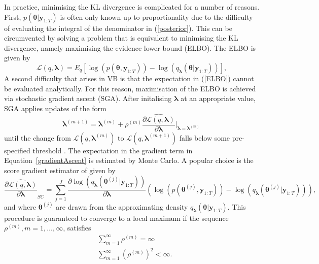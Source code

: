 \documentclass[12pt,a4paper]{article}\usepackage[]{graphicx}\usepackage[]{color}
\begin{document}
{In practice, minimising the KL divergence is complicated for a number of reasons.  First, $p({\bm\theta} | {\bm y}_{1:T})$ is often only known up to proportionality due to the difficulty of evaluating the integral of the denominator in (\ref{posterior}).  This can be circumvented by solving a problem that is equivalent to minimising the KL divergence, namely maximising the evidence lower bound (ELBO).  The ELBO is given by
\begin{equation}
\label{ELBO}
\mathcal{L}(q, {\bm\lambda}) = E_q \left[\log(p({\bm \theta}, {\bm y}_{1:T})) - \log(q_{\bm\lambda}({\bm\theta} | {\bm y}_{1:T}))\right],
\end{equation} 
A second difficulty that arises in VB is that the expectation in (\ref{ELBO}) cannot be evaluated analytically.  For this reason, maximisation of the ELBO is achieved via stochastic gradient ascent (SGA).  After initalising ${\bm \lambda}$ at an appropriate value, SGA applies updates of the form
\begin{equation}
\label{gradientAscent}
{\bm\lambda}^{(m+1)} = {\bm\lambda}^{(m)} + \rho^{(m)} \widehat{\frac{\partial\mathcal{L}(q, {\bm\lambda})}{\partial {\bm\lambda}}} \bigg\rvert_{{\bm\lambda} = {\bm\lambda}^{(m)}}\,
\end{equation}
until the change from $\mathcal{L}(q, {\bm\lambda}^{(m)})$ to $\mathcal{L}(q, {\bm \lambda}^{(m+1)})$ falls below some pre-specified threshold \citep{Hoffman2013}.  The expectation in the gradient term in Equation~\ref{gradientAscent} is estimated by Monte Carlo. A popular choice is the score gradient estimator of \citet{Ranganath2014} given by
\begin{equation}
\label{scoreDeriv}
\widehat{\frac{\partial\mathcal{L}(q, {\bm\lambda})}{\partial {\bm\lambda}}}_{SC} = \sum_{j = 1}^J \frac{\partial \log(q_{\bm \lambda}({\bm\theta}^{(j)} | {\bm y}_{1:T}))}{\partial {\bm\lambda}} \left(\log(p({\bm\theta}^{(j)}, {\bm y}_{1:T})) - \log(q_{\bm\lambda}({\bm\theta}^{(j)} | {\bm y}_{1:T})) \right),
\end{equation}
and where ${\bm\theta}^{(j)}$ are drawn from the approximating density $q_{\bm\lambda}({\bm\theta} | {\bm y}_{1:T})$.  This procedure is guaranteed to converge to a local maximum \citep{Robbins1951} if the sequence $\rho^{(m)}, m = 1, \dots, \infty$, satisfies
\begin{align}
&\sum_{m=1}^{\infty} \rho^{(m)} =  \infty \\
&\sum_{m=1}^{\infty} (\rho^{(m)})^2 <  \infty.
\end{align}
\\
}
\end{document}
